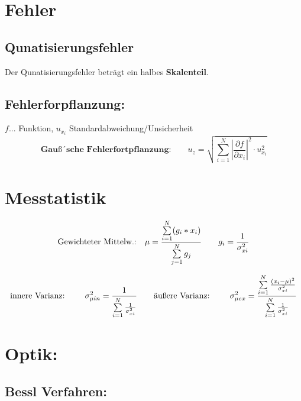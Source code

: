 \documentclass[final, 12pt]{article}
\begin{document}
  

\section{Fehler}
\subsection{Qunatisierungsfehler}
Der Qunatisierungsfehler beträgt ein halbes \textbf{Skalenteil}.\\

\subsection{Fehlerforpflanzung:}
$f$... Funktion, $u_{x_i}$ Standardabweichung/Unsicherheit
\begin{equation}
    \textbf{Gauß´sche Fehlerfortpflanzung:}\qquad u_z = \sqrt{\sum\limits_{i=1}^{N} \left|\frac{\partial f}{\partial x_i}\right|^2 \cdot u_{x_i}^2}   
    \label{eq:Gauß}    
\end{equation}

\section{Messtatistik}

\begin{equation}
    \text{Gewichteter Mittelw.:} \quad \mu = \frac{\sum\limits_{i=1}^{N}(g_i*x_i)}{\sum\limits_{j=1}^{N}g_j} \qquad g_i=\frac{1}{\sigma_{xi}^2}
    \label{eq:Mittelw}
\end{equation} 


\begin{equation}
    \text{innere Varianz: }\qquad \sigma_{\mu in}^2= \frac{1}{\sum\limits_{i=1}^{N}\frac{1}{\sigma_{xi}^2}} \qquad \text{äußere Varianz: }\qquad \sigma_{\mu ex}^2= \frac{\sum\limits_{i=1}^{N}\frac{(x_i-\mu)^2}{\sigma_{xi}^2}}{\sum\limits_{i=1}^{N}\frac{1}{\sigma_{xi}^2}}
    \label{eq:Varianz}
\end{equation} 
       

\section{Optik:}

\subsection{Bessl Verfahren:}
\end{document}
